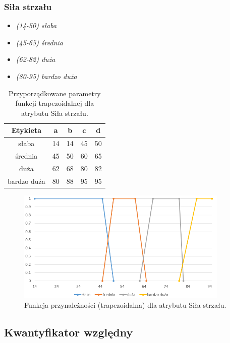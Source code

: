 \documentclass{classrep}
\begin{document}
	\subsubsection{Siła strzału}
	\begin{itemize}
		\item \textsl{(14-50) słaba}
		\item \textsl{(45-65) średnia}
		\item \textsl{(62-82) duża}
		\item \textsl{(80-95) bardzo duża}
	\end{itemize}
	\begin{table}[h!]
		\centering
		\begin{tabular} {c c c c c}
			\hline
			\textbf{Etykieta} & \textbf{a} & \textbf{b} & \textbf{c} & \textbf{d} \\ [0.5ex] 
			\hline	
			\hline 
			słaba & 14 & 14 & 45 & 50 \\
			średnia & 45 & 50 & 60 & 65  \\
			duża & 62 & 68 & 80 & 82  \\
			bardzo duża & 80 & 88 & 95 & 95  \\			
			\hline
		\end{tabular}
		\caption{Przyporządkowane parametry funkcji trapezoidalnej dla atrybutu Siła strzału. }
		\label{tabelaStrzal}
	\end{table}
	\begin{figure}[h!]
		\centering
		\includegraphics[width=0.9\textwidth]{zmienne/10.png}
		\caption{Funkcja przynależności (trapezoidalna) dla atrybutu Siła strzału.}
		\label{wykresStrzal}
	\end{figure}

	\newpage
	\subsection{Kwantyfikator względny}
	
\end{document}
